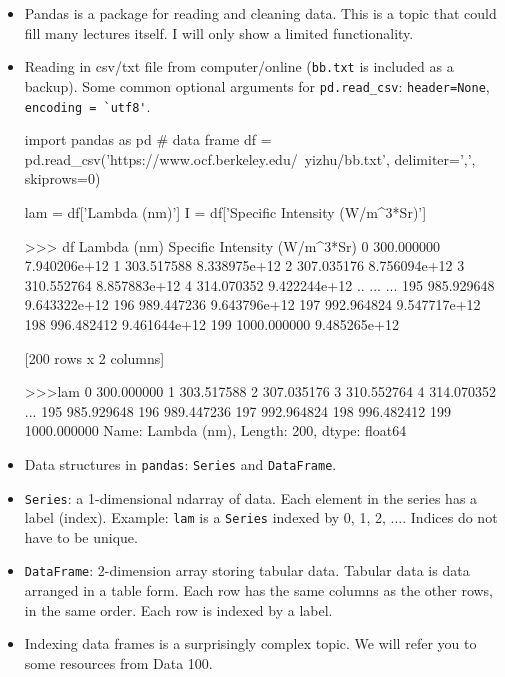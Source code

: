 \documentclass[12pt]{article}
\numberwithin{equation}{section}
\begin{document}
\begin{itemize}
    \item Pandas is a package for reading and cleaning data. This is a topic that could fill many lectures itself. I will only show a limited functionality.
    \item Reading in csv/txt file from computer/online (\verb|bb.txt| is included as a backup). Some common optional arguments for \verb|pd.read_csv|: \verb|header=None|, \verb|encoding = `utf8'|.
    \begin{python}
    import pandas as pd
    # data frame
    df = pd.read_csv('https://www.ocf.berkeley.edu/~yizhu/bb.txt',
                        delimiter=',', skiprows=0)
    
    lam = df['Lambda (nm)']
    I = df['Specific Intensity (W/m^3*Sr)']

    >>> df
             Lambda (nm)  Specific Intensity (W/m^3*Sr)
    0     300.000000                   7.940206e+12
    1     303.517588                   8.338975e+12
    2     307.035176                   8.756094e+12
    3     310.552764                   8.857883e+12
    4     314.070352                   9.422244e+12
    ..           ...                            ...
    195   985.929648                   9.643322e+12
    196   989.447236                   9.643796e+12
    197   992.964824                   9.547717e+12
    198   996.482412                   9.461644e+12
    199  1000.000000                   9.485265e+12
    
    [200 rows x 2 columns]
    
    >>>lam
    0       300.000000
    1       303.517588
    2       307.035176
    3       310.552764
    4       314.070352
              ...     
    195     985.929648
    196     989.447236
    197     992.964824
    198     996.482412
    199    1000.000000
    Name: Lambda (nm), Length: 200, dtype: float64
    \end{python}
	\item Data structures in \verb|pandas|: \verb|Series| and \verb|DataFrame|.
	\item \verb|Series|: a 1-dimensional ndarray of data. Each element in the series has a label (index). Example: \verb|lam| is a \verb|Series| indexed by 0, 1, 2, $\dots$. Indices do not have to be unique.
	\item \verb|DataFrame|: 2-dimension array storing tabular data. Tabular data is data arranged in a table form. Each row has the same columns as the other rows, in the same order. Each row is indexed by a label.
	\item Indexing data frames is a surprisingly complex topic. We will refer you to some resources from Data 100.
\end{itemize}
\end{document}
